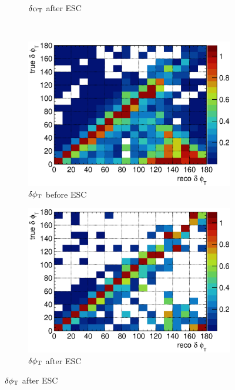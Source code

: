 \begin{figure}
\begin{subfigure}[b]{\dbfigwid\textwidth}
               \caption{$\delta\alpha_\textrm{T}$ after ESC}
               \label{subfig:esc-dalpha-afesc}
          \end{subfigure}
          \\
          \begin{subfigure}[b]{\dbfigwid\textwidth}
               \centering
               \includegraphics[width=\textwidth]{figures/perf/tki/dphitcolnor_resmat_al13.eps}
               \caption{$\delta\phi_\textrm{T}$ before ESC}
               \label{subfig:esc-dphit-bfesc}
          \end{subfigure}
          \begin{subfigure}[b]{\dbfigwid\textwidth}
               \centering
               \includegraphics[width=\textwidth]{figures/perf/tki/dphitcolnor_resmat_al14.eps}
               \caption{$\delta\phi_\textrm{T}$ after ESC}

\end{subfigure}
\end{figure}
